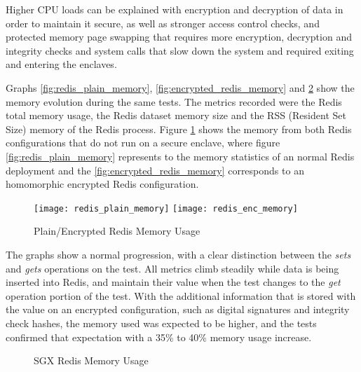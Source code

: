 Higher \gls{CPU} loads can be explained with encryption and decryption of data in order to maintain it secure, as well as stronger access control checks, and protected memory page swapping that requires more encryption, decryption and integrity checks and system calls that slow down the system and required exiting and entering the enclaves.

Graphs \ref{fig:redis_plain_memory}, \ref{fig:encrypted_redis_memory} and \ref{fig:redis_sgx_memory} show the memory evolution during the same tests. The metrics recorded were the Redis total memory usage, the Redis dataset memory size and the \gls{RSS} (Resident Set Size) memory of the Redis process. Figure \ref {fig:redis_plain_enc_memory_results} shows the memory from both Redis configurations that do not run on a secure enclave, where figure \ref{fig:redis_plain_memory} represents to the memory statistics of an normal Redis deployment and the  \ref{fig:encrypted_redis_memory} corresponds to an homomorphic encrypted Redis configuration.

\begin{figure}[htbp]
\hspace*{-8mm}
  \centering
    {\texttt{[image: redis\_plain\_memory]}}%
    {\texttt{[image: redis\_enc\_memory]}}%
  \caption{Plain/Encrypted Redis Memory Usage}
  \label{fig:redis_plain_enc_memory_results}
\end{figure}

The graphs show a normal progression, with a clear distinction between the \textit{sets} and \textit{gets} operations on the test. All metrics climb steadily while data is being inserted into Redis, and maintain their value when the test changes to the \textit{get} operation portion of the test. With the additional information that is stored with the value on an encrypted configuration, such as digital signatures and integrity check hashes, the memory used was expected to be higher, and the tests confirmed that expectation with a 35\% to 40\% memory usage increase.

\begin{figure}[htbp]
  \caption{SGX Redis Memory Usage}
  \label{fig:redis_sgx_memory}
\end{figure}

